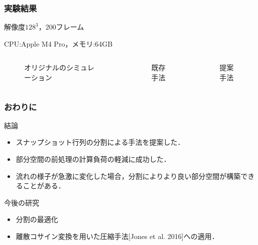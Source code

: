 \documentclass[aspectratio=169,dvipdfmx,hyperref={bookmarks=true}]{beamer}
\begin{document}
 \begin{frame}
 \frametitle{実験結果}
\begin{block}{}
解像度$128^3$，$200$フレーム

CPU:Apple M4 Pro，メモリ:64GB

\end{block}
\begin{columns}
    \begin{column}{0.33\textwidth}
   \begin{figure}
\caption{オリジナルのシミュレーション}
   \end{figure}
    \end{column}
    \begin{column}{0.33\textwidth}
       \begin{figure}
\caption{既存手法}
   \end{figure}
    \end{column}
    \begin{column}{0.33\textwidth}
       \begin{figure}
\caption{提案手法}
   \end{figure}
    \end{column}
\end{columns}
\end{frame}
  
 \begin{frame}
 \frametitle{おわりに}
\begin{block}{結論}
\begin{itemize}
	\item スナップショット行列の分割による手法を提案した．
	\item 部分空間の前処理の計算負荷の軽減に成功した．
	\item 流れの様子が急激に変化した場合，分割によりより良い部分空間が構築できることがある．
\end{itemize}
\end{block}
\begin{block}{今後の研究}
\begin{itemize}
	\item 分割の最適化
	\item 離散コサイン変換を用いた圧縮手法[Jones et al. 2016]への適用．
\end{itemize}
\end{block}
\end{frame}
\end{document}
